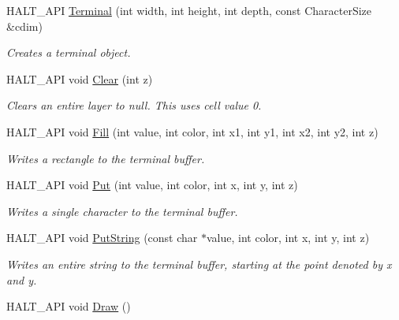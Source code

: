 \begin{DoxyCompactItemize}
\item 
\-H\-A\-L\-T\-\_\-\-A\-P\-I \hyperlink{classhalt_1_1_terminal_a6bf4f170cefda0290f5b0c842de35b48}{\-Terminal} (int width, int height, int depth, const \-Character\-Size \&cdim)
\begin{DoxyCompactList}\small\item\em \-Creates a terminal object. \end{DoxyCompactList}\item 
\-H\-A\-L\-T\-\_\-\-A\-P\-I void \hyperlink{classhalt_1_1_terminal_a03a3b656291dd66da663e83ac34d3552}{\-Clear} (int z)
\begin{DoxyCompactList}\small\item\em \-Clears an entire layer to null. \-This uses cell value 0. \end{DoxyCompactList}\item 
\-H\-A\-L\-T\-\_\-\-A\-P\-I void \hyperlink{classhalt_1_1_terminal_a0ecf4ea61d6d6f577ad4ed92a22a705b}{\-Fill} (int value, int color, int x1, int y1, int x2, int y2, int z)
\begin{DoxyCompactList}\small\item\em \-Writes a rectangle to the terminal buffer. \end{DoxyCompactList}\item 
\-H\-A\-L\-T\-\_\-\-A\-P\-I void \hyperlink{classhalt_1_1_terminal_ae553a9c7c2ad96b41228040b42bcc36b}{\-Put} (int value, int color, int x, int y, int z)
\begin{DoxyCompactList}\small\item\em \-Writes a single character to the terminal buffer. \end{DoxyCompactList}\item 
\-H\-A\-L\-T\-\_\-\-A\-P\-I void \hyperlink{classhalt_1_1_terminal_a64044593efed03aa9190ceaa5a38d7e2}{\-Put\-String} (const char $\ast$value, int color, int x, int y, int z)
\begin{DoxyCompactList}\small\item\em \-Writes an entire string to the terminal buffer, starting at the point denoted by x and y. \end{DoxyCompactList}\item 
\hypertarget{classhalt_1_1_terminal_ae23deb8d04a7052f50d54bbb9b614920}{\-H\-A\-L\-T\-\_\-\-A\-P\-I void \hyperlink{classhalt_1_1_terminal_ae23deb8d04a7052f50d54bbb9b614920}{\-Draw} ()}\label{classhalt_1_1_terminal_ae23deb8d04a7052f50d54bbb9b614920}


\end{DoxyCompactItemize}
